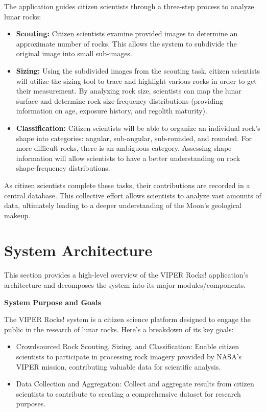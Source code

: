 \documentclass{article}
\begin{document}
The application guides citizen scientists through a three-step process to analyze lunar rocks:
\begin{itemize}
	\item \textbf{Scouting:} Citizen scientists examine provided images to determine an approximate number of rocks. This allows the system to subdivide the original image into small sub-images.
	\item \textbf{Sizing:} Using the subdivided images from the scouting task, citizen scientists will utilize the sizing tool to trace and highlight various rocks in order to get their measurement. By analyzing rock size, scientists can map the lunar surface and determine rock size-frequency distributions (providing information on age, exposure history, and regolith maturity).
	\item \textbf{Classification:} Citizen scientists will be able to organize an individual rock’s shape into categories: angular, sub-angular, sub-rounded, and rounded. For more difficult rocks, there is an ambiguous category. Assessing shape information will allow scientists to have a better understanding on rock shape-frequency distributions.
\end{itemize}
As citizen scientists complete these tasks, their contributions are recorded in a central database. This collective effort allows scientists to analyze vast amounts of data, ultimately leading to a deeper understanding of the Moon’s geological makeup.

\section{System Architecture}
This section provides a high-level overview of the VIPER Rocks! application’s architecture and decomposes the system into its major modules/components.

\textbf{System Purpose and Goals}

The VIPER Rocks! system is a citizen science platform designed to engage the public in the research of lunar rocks. Here’s a breakdown of its key goals:
\begin{itemize}
	\item Crowdsourced Rock Scouting, Sizing, and Classification: Enable citizen scientists to participate in processing rock imagery provided by NASA’s VIPER mission, contributing valuable data for scientific analysis.
	\item Data Collection and Aggregation: Collect and aggregate results from citizen scientists to contribute to creating a comprehensive dataset for research purposes. 
\end{itemize}
\end{document}
